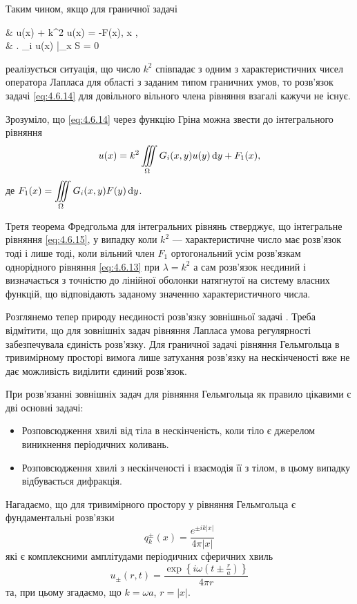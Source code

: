 Таким чином, якщо для граничної задачі
\begin{system}
	\label{eq:4.6.14}
	& \Delta u(x) + k^2 u(x) = -F(x), \quad x \in \Omega, \\
	& \left. \ell_i u(x) \right|_{x \in S} = 0
\end{system}
реалізується ситуація, що число $ k^2$  співпадає з одним з характеристичних чисел оператора Лапласа для області   з заданим типом граничних умов, то розв'язок задачі \eqref{eq:4.6.14} для довільного вільного члена рівняння взагалі кажучи не існує. \medskip

Зрозуміло, що \eqref{eq:4.6.14} через функцію Гріна  можна звести до інтегрального рівняння
\begin{equation}
	\label{eq:4.6.15}
	u(x) = k^2 \displaystyle\iiint\limits_\Omega G_i(x, y) u(y) \mathop{}\!\mathrm{d} y + F_1(x),
\end{equation}
де $F_1(x) = \displaystyle\iiint\limits_\Omega G_i(x, y) F(y) \mathop{}\!\mathrm{d} y$. \medskip

Третя теорема Фредгольма для інтегральних рівнянь стверджує, що інтегральне рівняння \eqref{eq:4.6.15}, у випадку коли $k^2$ --- характеристичне число має розв'язок тоді і лише тоді, коли вільний член $F_1$ ортогональний усім розв'язкам однорідного рівняння \eqref{eq:4.6.13} при $\lambda = k^2$ а сам розв'язок неєдиний і визначається з точністю до лінійної оболонки натягнутої на систему власних функцій, що відповідають заданому значенню характеристичного числа. \medskip

Розглянемо тепер природу неєдиності розв'язку зовнішньої задачі . Треба відмітити, що для зовнішніх задач рівняння Лапласа умова регулярності забезпечувала єдиність розв'язку. Для граничної задачі рівняння Гельмгольца в тривимірному просторі вимога лише затухання розв'язку на нескінченості вже не дає можливість виділити єдиний розв'язок. \medskip

При розв'язанні зовнішніх задач для рівняння Гельмгольца як правило цікавими є дві основні задачі:
\begin{itemize}
	\item Розповсюдження хвилі від тіла в нескінченість, коли тіло є джерелом виникнення періодичних коливань.
	\item Розповсюдження хвилі з нескінченості і взаємодія її з тілом, в цьому випадку відбувається дифракція.
\end{itemize}

Нагадаємо, що для тривимірного простору у рівняння Гельмгольца є фундаментальні розв'язки 
\begin{equation}
	\label{eq:4.6.16}
	q_k^\pm(x) = \frac{e^{\pm i k |x|}}{4 \pi |x|}
\end{equation}
які є комплексними амплітудами періодичних сферичних хвиль
\begin{equation}
	\label{eq:4.6.17}
	u_\pm(r, t) = \frac{\exp\left\{i \omega \left( t \pm \frac{r}{a} \right)\right\}}{4 \pi r}
\end{equation}
та, при цьому згадаємо, що $k = \omega  a$, $r = |x|$. \medskip

